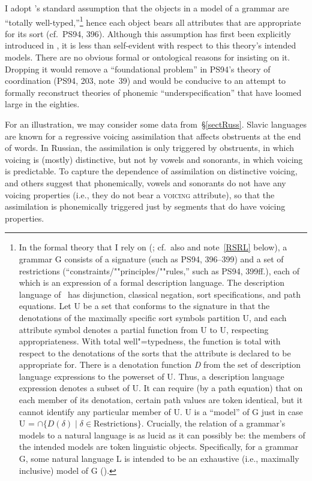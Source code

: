 \documentclass[output=paper]{langsci/langscibook}
\begin{document}
I adopt 's standard assumption that the objects in a model of a grammar
are ``totally well-typed,''\footnote{%
	In the formal theory that I rely on
  (\citealt{king:89}; cf.\ also \citealt{king:94} and
  note~\ref{RSRL} below), a grammar G consists of a signature (such as
  \small{PS94}, 396--399) and a set of restrictions
  (``constraints/""principles/""rules,'' such as \small{PS94},
  399\hspace{1pt}ff.), each of which is an expression of a formal
  description language.  The 
  description language
  of~\cite{king:89} has disjunction, classical negation, sort
  specifications, and path equations. Let U be a set that conforms to the
  signature in that the denotations of the maximally specific sort symbols
  partition U, and each attribute symbol denotes a partial function from U
  to U, respecting appropriateness.  With total well"=typedness, the
  function is total 
with respect to
the denotations of the sorts that the attribute
  is declared to be appropriate for. There is a denotation function \textit{D}\/ from the set of description language expressions to the powerset
  of U\@. Thus, a description language expression denotes a subset of U\@.
  It can require (by a path equation) that on each member of its
  denotation, certain path values are token identical, but it cannot
  identify any particular member of U\@.  U is a ``model'' of G just in
  case U = $\cap \{ D(\delta) \mid \delta \in \mbox{Restrictions} \}$.
  Crucially, the relation of a grammar's models to a natural language is as
  lucid as it can possibly be: the members of the intended models are token
  linguistic objects.  Specifically, for a grammar G, some natural language
  L is intended to be an exhaustive (i.e., maximally inclusive) model of G
  (\citealt{king:95a,king:99}).%
}
hence each object bears all
attributes that are appropriate for its sort (cf.\ {\small PS94}, 396).
Although this assumption has first been explicitly introduced
in \cite{king:89}, it is less than self-evident 
with respect to
this
theory's intended models.  There are no obvious formal or ontological
reasons for insisting on it. Dropping it would remove a ``foundational
problem'' in {\small PS94}'s theory of coordination ({\small PS94}, 203,
note~39) and would be conducive to an attempt to formally reconstruct
theories of phonemic ``underspecification'' that have loomed large in the
eighties.
 
For an illustration, we may consider some data from~\S\ref{sectRuss}.
Slavic languages are known for a regressive voicing assimilation that
affects obstruents at the end of words. In Russian, the
assimilation is only triggered by obstruents, in which voicing is (mostly)
distinctive, but not by vowels and sonorants, in which voicing is
predictable. To capture the dependence of assimilation on distinctive
voicing, \cite{kipa:85} and others suggest that
phonemically, vowels and sonorants do not have any voicing properties
(i.e., they do not bear a \textsc{voicing} attribute), so that the
assimilation is phonemically triggered just by segments that do have
voicing properties.
\end{document}
